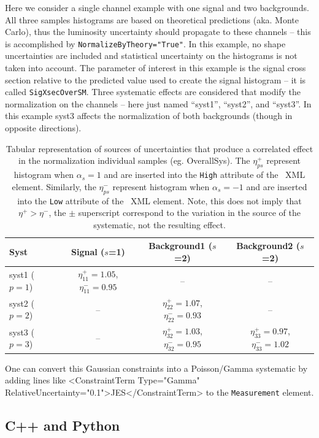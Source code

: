 Here we consider a single channel example with one signal and two backgrounds.  All three samples histograms are based on theoretical predictions (aka. Monte Carlo), thus the luminosity uncertainty should propagate to these channels --  this is accomplished by \texttt{NormalizeByTheory="True"}.  In this example, no shape uncertainties are included and statistical uncertainty on the histograms is not taken into account.  The parameter of interest in this example is the signal cross section relative to the predicted value used to create the signal histogram -- it is called \texttt{SigXsecOverSM}.  Three systematic effects are considered that modify the normalization on the channels -- here just named ``syst1'', ``syst2'', and ``syst3''.  In this example syst3 affects the normalization of both backgrounds (though in opposite directions).

\begin{table}[h]
\center
\begin{tabular}{l | c c c}
Syst & Signal ($s$=1) & Background1 ($s$=2)& Background2 ($s$=2)\\ \hline
syst1 ($p=1$) & $\eta_{11}^+=1.05$, \;$\eta_{11}^-=0.95$ & -- & -- \\
syst2 ($p=2$)& -- & $\eta_{22}^+=1.07$, \;$\eta_{22}^-=0.93$ & -- \\
syst3 ($p=3$)& -- &  $\eta_{32}^+=1.03$, \;$\eta_{32}^-=0.95$   & $\eta_{33}^+=0.97$, \;$\eta_{33}^-=1.02$ \\
\end{tabular}
\caption{Tabular representation of sources of uncertainties that produce a correlated effect in the normalization individual samples (eg. OverallSys).  The $\eta^+_{ps}$ represent histogram when $\alpha_s=1$ and are inserted into the \texttt{High} attribute of the \OS\  XML element.  Similarly, the $\eta^-_{ps}$ represent histogram when $\alpha_s=-1$ and are inserted into the \texttt{Low} attribute of the \OS\  XML element. Note, this does not imply that $\eta^+ > \eta^-$, the $\pm$ superscript correspond to the variation in the source of the systematic, not the resulting effect.}
\end{table}


\newpage

%
%



One can convert this Gaussian constraints into a Poisson/Gamma systematic by adding lines like
{\tiny
   <ConstraintTerm Type="Gamma" RelativeUncertainty="0.1">JES</ConstraintTerm>
}
to the {\tt Measurement} element.  


\subsection{C++ and Python}

